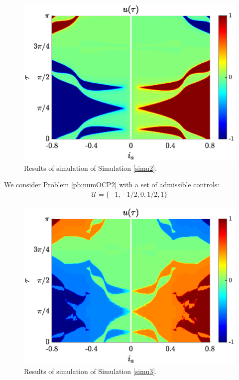 \documentclass[twocolumn]{autart}    %
\begin{document}
\begin{remark}
\begin{figure}[ht!]
    \hspace{0.05em}
    \includegraphics[scale=0.525]{img/fig06.eps}
    \caption{Results of simulation of Simulation \ref{simu2}.}\label{fig:sim-bang-off-bang}
\end{figure} 

\vspace{1em}
\begin{simulation}\label{simu3}
We consider Problem \ref{pb:numOCP2} with a set of admissible controls:
\begin{align*}
    \mathcal{U} = \{-1,-1/2,0,1/2,1\}
\end{align*} 
\end{simulation}

\begin{figure}[ht!]
    \hspace{0.05em}
    \includegraphics[scale=0.525]{img/fig08.eps}
    \caption{Results of simulation of Simulation \ref{simu3}.}
    \label{fig:sim-multi-level}
\end{figure} 


\end{remark}
\end{document}
